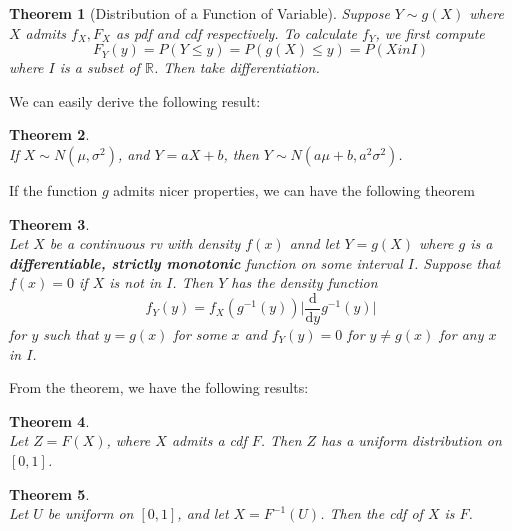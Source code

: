 \documentclass[12pt]{article}
\newcommand{\diff}{\mathrm{d}}
\newtheorem{theorem}{Theorem}[section]
\theoremstyle{definition}
\begin{document}
\begin{theorem}[Distribution of a Function of Variable]
\hfill Suppose $Y\sim g(X)$ where $X$ admits $f_X, F_X$ as pdf and cdf respectively. To calculate $f_Y$, we first compute
\[
F_Y(y) = P(Y\leq y) = P(g(X)\leq y) = P(X in I) 
\]
where $I$ is a subset of $\mathbb{R}$. Then take differentiation.
\end{theorem}
We can easily derive the following result:
\begin{theorem}
\hfill\\\normalfont If $X\sim N(\mu, \sigma^2)$, and $Y=aX+b$, then $Y\sim N(a\mu+b, a^2\sigma^2)$.
\end{theorem}
If the function $g$ admits nicer properties, we can have the following theorem
\begin{theorem}
\hfill\\\normalfont Let $X$ be a continuous rv with density $f(x)$ annd let $Y = g(X)$ where $g$ is a \textbf{differentiable, strictly monotonic} function on some interval $I$. Suppose that $f(x) = 0$ if $X$ is not in $I$. Then $Y$ has the density function
\[
f_Y(y) = f_X(g^{-1}(y))\lvert\frac{\diff}{\diff y} g^{-1}(y)\rvert
\]
for $y$ such that $y=g(x)$ for some $x$ and $f_Y(y) = 0$ for $y\neq g(x)$ for any $x$ in $I$. 
\end{theorem}
From the theorem, we have the following results:
\begin{theorem}
\hfill\\\normalfont Let $Z=F(X)$, where $X$ admits a cdf $F$. Then $Z$ has a uniform distribution on $[0,1]$.
\end{theorem}
\begin{theorem}
\hfill\\\normalfont Let $U$ be uniform on $[0,1]$, and let $X=F^{-1}(U)$. Then the cdf of $X$ is $F$.
\end{theorem}
\end{document}
